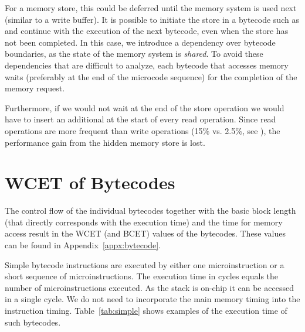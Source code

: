 For a memory store, this  could be deferred until the
memory system is used next (similar to a write buffer). It is
possible to initiate the store in a bytecode such as 
and continue with the execution of the next bytecode, even when the
store has not been completed. In this case, we introduce a
dependency over bytecode boundaries, as the state of the memory
system is \emph{shared}. To avoid these dependencies that are
difficult to analyze, each bytecode that accesses memory waits
(preferably at the end of the microcode sequence) for the completion
of the memory request.

Furthermore, if we would not wait at the end of the store operation
we would have to insert an additional  at the start of
every read operation. Since read operations are more frequent than
write operations (15\% vs. 2.5\%, see \cite{jop:thesis}), the
performance gain from the hidden memory store is lost.

\section{WCET of Bytecodes} \label{sec:wcet:bc}
The control flow of the individual bytecodes together with the basic
block length (that directly corresponds with the execution time) and
the time for memory access result in the WCET (and BCET) values of
the bytecodes. These values can be found in
Appendix~\ref{appx:bytecode}.


Simple bytecode instructions are executed by either one
microinstruction or a short sequence of microinstructions. The
execution time in cycles equals the number of microinstructions
executed. As the stack is on-chip it can be accessed in a single
cycle. We do not need to incorporate the main memory timing into the
instruction timing. Table~\ref{tab:simple} shows examples of the
execution time of such bytecodes.


